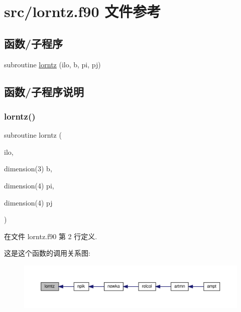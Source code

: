 \hypertarget{lorntz_8f90}{}\section{src/lorntz.f90 文件参考}
\label{lorntz_8f90}
\subsection*{函数/子程序}
\begin{DoxyCompactItemize}
\item 
subroutine \mbox{\hyperlink{lorntz_8f90_a559908e5a01d48a90351be5a61af9d4e}{lorntz}} (ilo, b, pi, pj)
\end{DoxyCompactItemize}


\subsection{函数/子程序说明}
\mbox{\label{lorntz_8f90_a559908e5a01d48a90351be5a61af9d4e}} 
\subsubsection{\texorpdfstring{lorntz()}{lorntz()}}
{\footnotesize\ttfamily subroutine lorntz (\begin{DoxyParamCaption}\item[{}]{ilo,  }\item[{dimension(3)}]{b,  }\item[{dimension(4)}]{pi,  }\item[{dimension(4)}]{pj }\end{DoxyParamCaption})}



在文件 lorntz.\+f90 第 2 行定义.

这是这个函数的调用关系图\+:
\nopagebreak
\begin{figure}[H]
\begin{center}
\leavevmode
\includegraphics[width=350pt]{lorntz_8f90_a559908e5a01d48a90351be5a61af9d4e_icgraph}
\end{center}
\end{figure}

